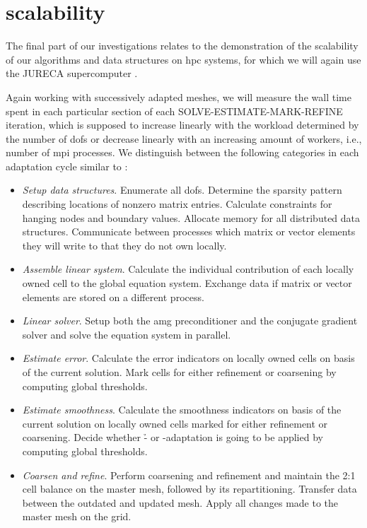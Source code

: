 \section{ scalability}
\label{sec:scaling}

The final part of our investigations relates to the demonstration of the scalability of our algorithms and data structures on \gls{hpc} systems, for which we will again use the JURECA supercomputer \parencite{krause2016,jureca}.

Again working with successively adapted meshes, we will measure the wall time spent in each particular section of each SOLVE-ESTIMATE-MARK-REFINE iteration, which is supposed to increase linearly with the workload determined by the number of \glspl{dof} or decrease linearly with an increasing amount of workers, i.e., number of \gls{mpi} processes. We distinguish between the following categories in each adaptation cycle similar to \textcite{bangerth2012}:
\begin{itemize}
\item \textit{Setup data structures}. Enumerate all \glspl{dof}. Determine the sparsity pattern describing locations of nonzero matrix entries. Calculate constraints for hanging nodes and boundary values. Allocate memory for all distributed data structures. Communicate between processes which matrix or vector elements they will write to that they do not own locally.
\item \textit{Assemble linear system}. Calculate the individual contribution of each locally owned cell to the global equation system. Exchange data if matrix or vector elements are stored on a different process.
\item \textit{Linear solver}. Setup both the \gls{amg} preconditioner and the conjugate gradient solver and solve the equation system in parallel.
\item \textit{Estimate error}. Calculate the error indicators on locally owned cells on basis of the current solution. Mark cells for either refinement or coarsening by computing global thresholds.
\item \textit{Estimate smoothness}. Calculate the smoothness indicators on basis of the current solution on locally owned cells marked for either refinement or coarsening. Decide whether \h- or \p-adaptation is going to be applied by computing global thresholds.
\item \textit{Coarsen and refine}. Perform coarsening and refinement and maintain the 2:1 cell balance on the \pforest{} master mesh, followed by its repartitioning. Transfer data between the outdated and updated mesh. Apply all changes made to the master mesh on the \dealii{} grid.
\end{itemize}

